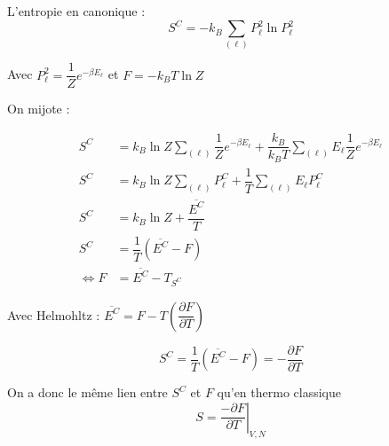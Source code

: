 \documentclass[12pt,a4paper]{report}
\begin{document}
L'entropie en canonique :
\[
	S^C = -k_B \sum_{(\ell)} P_\ell^2 \ln P_\ell^2
\]

Avec \(P_\ell^2 = \dfrac{1}{Z} e^{-\beta E_\ell}\) et \(F = -k_B T \ln Z\)

On mijote :

\begin{align*}
	S^C &= k_B \ln Z \sum_{(\ell)} \dfrac{1}{Z} e^{-\beta E_\ell} + \dfrac{k_B}{k_B T} \sum_{(\ell)} E_\ell \dfrac{1}{Z} e^{-\beta E_\ell}\\
	S^C &= k_B \ln Z \sum_{(\ell)} P_\ell^C + \dfrac{1}{T} \sum_{(\ell)} E_\ell P_\ell^C\\
	S^C &= k_B \ln Z + \dfrac{\overline{E^C}}{T}\\
	S^C &= \dfrac{1}{T} \left( \overline{E^C} - F \right)\\
	\Leftrightarrow F &= \overline{E^C} - T_{S^C}
\end{align*}

Avec Helmohltz : \(\overline{E^C} = F - T\left( \dfrac{\partial F}{\partial T} \right)\)

\[
	S^C = \dfrac{1}{T} \left( \overline{E^C} - F \right) = - \dfrac{\partial F}{\partial T}
\]

On a donc le même lien entre \(S^C\) et \(F\) qu'en thermo classique
\[
	S = \left. \dfrac{-\partial F}{\partial T}\right|_{V, N}
\]
\end{document}
